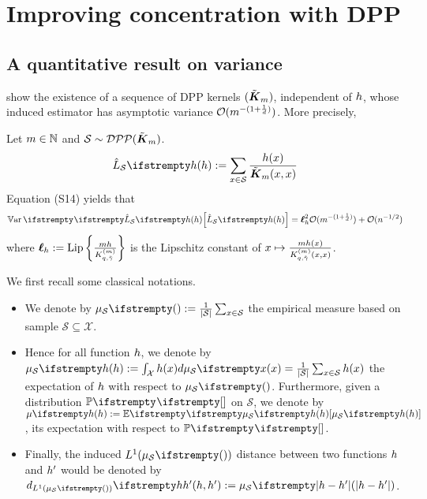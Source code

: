 

\chapter{Improving concentration with DPP}
\section{A quantitative result on variance}


\cite{bardenet2021sgddpp} show the existence of a sequence of DPP kernels $(\tilde{\boldsymbol K}_{m})$, independent of $h$, whose induced estimator has asymptotic variance $\mathcal{O}( m ^{-(1+\frac 1 d)})$. More precisely, 

\begin{tcolorbox}
	\begin{theorem}
		\label{thm_sgdpaper}
		Let $m\in \mathbb{N}$ and $\mathcal{S} \sim  \mathcal{DPP}(\tilde{\boldsymbol K}_{m})$.
		\begin{equation}
			\estloss{\mathcal{S}}{\threequery} := \sum_{x \in \mathcal{S}} \frac{\threequery(x)}{\opekernel{m}(x,x)}
		\end{equation}
		Equation (S14) yields that 
		\begin{equation}
			\Var{}{\estloss{\mathcal{S}}{\threequery}} = \lipschitz^2_\threequery \OO( m ^{-(1+\frac 1 d)}) +\OO( n^{-1/2})
		\end{equation}
		where $\boldsymbol\ell_h := \operatorname{Lip}\left\{\frac{mh}{K^{(m)}_{q, \tilde \gamma}} \right\}$ is the Lipschitz constant of $x \mapsto \frac{mh(x)}{K^{(m)}_{q, \tilde \gamma}(x,x)}$.
	\end{theorem}
\end{tcolorbox}



We first recall some classical notations.
\begin{itemize}
	\item We denote by $\empdistr{\mathcal{S}}{}:=\frac{1}{|\mathcal{S}|} \sum_{x \in \mathcal{S}}$ the empirical measure based on sample $\mathcal{S}  \subseteq \mathcal{X}$. 
	\item Hence for all function $h$, we denote by $\empdistr{\mathcal{S}}{\threequery}:=\int_{\mathcal{X}} \threequery(x) d\empdistr{\mathcal{S}}{x} = \frac{1}{|\mathcal{S}|} \sum_{x \in \mathcal{S}} \threequery(x)$ the expectation of $h$ with respect to $\empdistr{\mathcal{S}}{}$. Furthermore, given a distribution $\PP{}{}$ on $\mathcal{S}$, we denote by $\meanempdistr{\threequery}:=\EE{}{\empdistr{\mathcal{S}}{\threequery}}$, its expectation with respect to $\PP{}{}$. 
	\item Finally, the induced $L^1(\empdistr{\mathcal{S}}{})$ distance between two functions $h$ and $h'$ would be denoted by $\dlone{\empdistr{\mathcal{S}}{}}{\threequery}{\threequery'}:=\empdistr{\mathcal{S}}{|\threequery - \threequery'|}$.
\end{itemize}  


